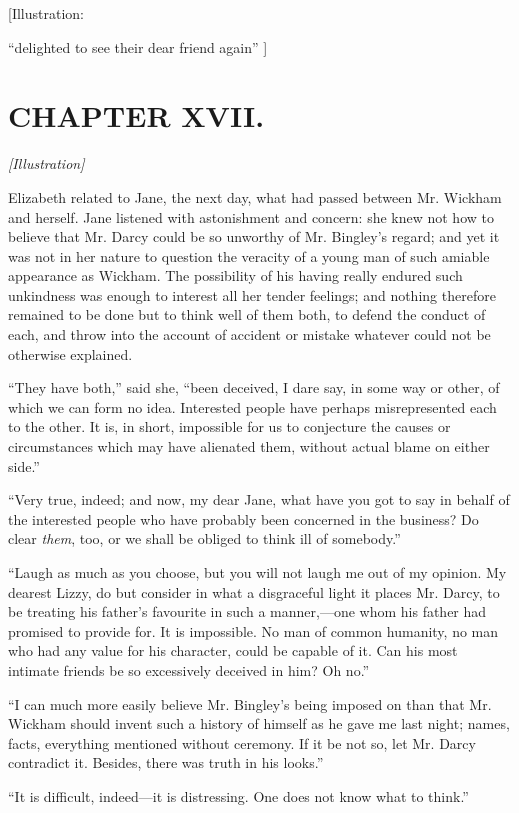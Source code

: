 \documentclass[12pt]{book}
\begin{document}
[Illustration:

``delighted to see their dear friend again'' ]

\chapter{CHAPTER XVII.}

\emph{[Illustration]}

Elizabeth related to Jane, the next day, what had passed between Mr. Wickham and herself. Jane listened with astonishment and concern: she knew not how to believe that Mr. Darcy could be so unworthy of Mr. Bingley's regard; and yet it was not in her nature to question the veracity of a young man of such amiable appearance as Wickham. The possibility of his having really endured such unkindness was enough to interest all her tender feelings; and nothing therefore remained to be done but to think well of them both, to defend the conduct of each, and throw into the account of accident or mistake whatever could not be otherwise explained.

``They have both,'' said she, ``been deceived, I dare say, in some way or other, of which we can form no idea. Interested people have perhaps misrepresented each to the other. It is, in short, impossible for us to conjecture the causes or circumstances which may have alienated them, without actual blame on either side.''

``Very true, indeed; and now, my dear Jane, what have you got to say in behalf of the interested people who have probably been concerned in the business? Do clear \textit{them}, too, or we shall be obliged to think ill of somebody.''

``Laugh as much as you choose, but you will not laugh me out of my opinion. My dearest Lizzy, do but consider in what a disgraceful light it places Mr. Darcy, to be treating his father's favourite in such a manner,---one whom his father had promised to provide for. It is impossible. No man of common humanity, no man who had any value for his character, could be capable of it. Can his most intimate friends be so excessively deceived in him? Oh no.''

``I can much more easily believe Mr. Bingley's being imposed on than that Mr. Wickham should invent such a history of himself as he gave me last night; names, facts, everything mentioned without ceremony. If it be not so, let Mr. Darcy contradict it. Besides, there was truth in his looks.''

``It is difficult, indeed---it is distressing. One does not know what to think.''
\end{document}
